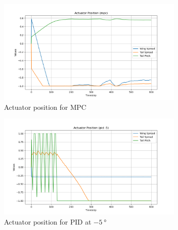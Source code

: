 \renewcommand{\thechapter}{\Alph{chapter}}
\renewcommand{\thefigure}{\Alph{chapter}.\arabic{figure}}
\renewcommand{\chaptername}{Appendix}

\clearpage
\chapter{}\label{apdx:A}
\checkandfixthelayout
\vfill{}
\begin{figure}[h]
    \centering
    \begin{subfigure}[b]{0.6\textwidth}
        \centering
        \includegraphics[width=\textwidth]{./img/ActuatorMPC.png}
        \caption{Actuator position for MPC}
    \end{subfigure}
    \begin{subfigure}[b]{0.6\textwidth}
        \centering
        \includegraphics[width=\textwidth]{./img/ActuatorPID-5.png}
        \caption{Actuator position for PID at $\SI{-5}{\degree}$}
    \end{subfigure}
    \begin{subfigure}[b]{0.6\textwidth}

\end{subfigure}
\end{figure}
